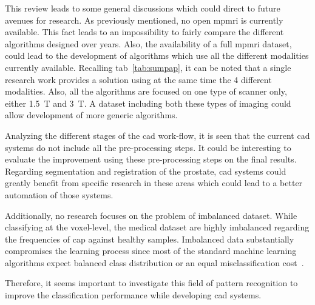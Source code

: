 This review leads to some general discussions which could direct to future avenues for research.
As previously mentioned, no open \ac{mpmri} is currently available.
This fact leads to an impossibility to fairly compare the different algorithms designed over years.
Also, the availability of a full \ac{mpmri} dataset, could lead to the development of algorithms which use all the different modalities currently available.
Recalling \acs{tab}~\ref{tab:sumpap}, it can be noted that a single research work provides a solution using at the same time the 4 different modalities.
Also, all the algorithms are focused on one type of scanner only, either \SI{1.5}{\tesla} and \SI{3}{\tesla}.
A dataset including both these types of imaging could allow development of more generic algorithms.

Analyzing the different stages of the \ac{cad} work-flow, it is seen that the current \ac{cad} systems do not include all the pre-processing steps.
It could be interesting to evaluate the improvement using these pre-processing steps on the final results.
Regarding segmentation and registration of the prostate, \ac{cad} systems could greatly benefit from specific research in these areas which could lead to a better automation of those systems.


Additionally, no research focuses on the problem of imbalanced dataset.
While classifying at the voxel-level, the medical dataset are highly imbalanced regarding the frequencies of \ac{cap} against healthy samples.
Imbalanced data substantially compromises the learning process since most of the standard machine learning algorithms expect balanced class distribution or an equal misclassification cost~\cite{he2009learning}.

Therefore, it seems important to investigate this field of pattern recognition to improve the classification performance while developing \ac{cad} systems.

